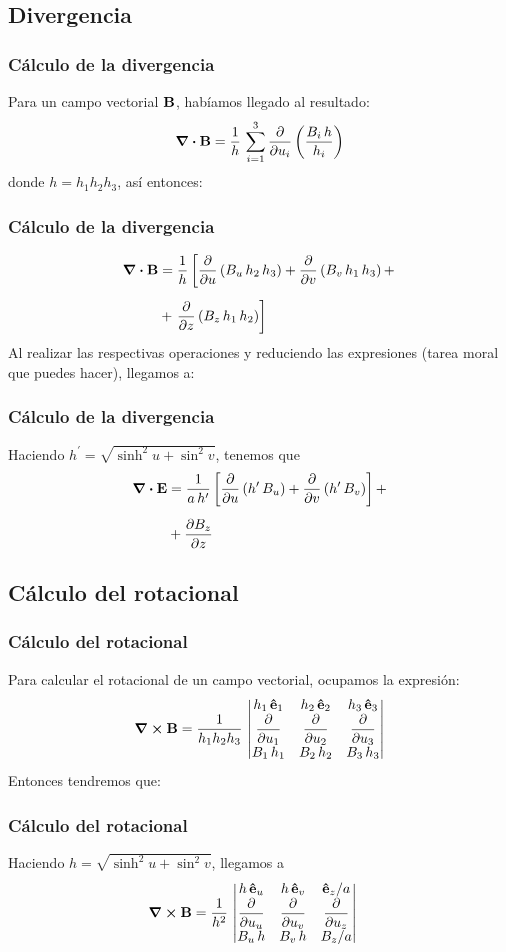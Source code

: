 \documentclass[12pt]{beamer}
\begin{document}
\subsection{Divergencia}
\begin{frame}
\frametitle{Cálculo de la divergencia}
Para un campo vectorial $\vb{B}$, habíamos llegado al resultado:
\begin{align*}
\div{\vb{B}} = \dfrac{1}{h} \, \sum_{i=1}^{3} \pdv{u_{i}} \left( \dfrac{B_{i} \, h}{h_{i}} \right)
\end{align*}
donde $h = h_{1} h_{2} h_{3}$, así entonces:
\end{frame}
\begin{frame}
\frametitle{Cálculo de la divergencia}
\begin{align*}
\div{\vb{B}} &= \dfrac{1}{h} \left[ \pdv{u} \left( B_{u} \, h_{2} \, h_{3} \right) + \pdv{v} \left( B_{v} \, h_{1} \, h_{3} \right) + \right. \\[0.5em]
&+ \left.\pdv{z} \left( B_{z} \, h_{1} \, h_{2} \right) \right]
\end{align*}
\pause
Al realizar las respectivas operaciones y reduciendo las expresiones (tarea moral que puedes hacer), llegamos a:
\end{frame}
\begin{frame}
\frametitle{Cálculo de la divergencia}
Haciendo $h^{\prime} = \sqrt{\sinh^{2} u + \sin^{2} v}$, tenemos que 
\begin{align*}
\div{\vb{E}} &= \dfrac{1}{a \, h^{\prime}} \left[ \pdv{u} \left( h^{\prime} \, B_{u} \right) + \pdv{v} \left( h^{\prime} \, B_{v} \right) \right] + \\[0.5em]
&+ \pdv{B_{z}}{z}
\end{align*}
\end{frame}
\subsection{Cálculo del rotacional}
\begin{frame}
\frametitle{Cálculo del rotacional}
Para calcular el rotacional de un campo vectorial, ocupamos la expresión:
\begin{align*}
\curl{\vb{B}} = \dfrac{1}{h_{1} h_{2} h_{3}} \, \mdet{
h_{1} \, \vu{e}_{1} & h_{2} \, \vu{e}_{2} & h_{3} \, \vu{e}_{3} \\
\displaystyle \pdv{u_{1}} & \displaystyle \pdv{u_{2}} & \displaystyle \pdv{u_{3}} \\
B_{1} \, h_{1} & B_{2} \, h_{2} & B_{3} \, h_{3}
}
\end{align*}
Entonces tendremos que:
\end{frame}
\begin{frame}
\frametitle{Cálculo del rotacional}
Haciendo $h = \sqrt{\sinh^{2} u + \sin^{2} v}$, llegamos a
\begin{align*}
\curl{\vb{B}} &= \dfrac{1}{h^{2}}  \, \mdet{
h \, \vu{e}_{u} & h \, \vu{e}_{v} & \vu{e}_{z} / a \\
\displaystyle \pdv{u_{u}} & \displaystyle \pdv{u_{v}} & \displaystyle \pdv{u_{z}} \\
B_{u} \, h & B_{v} \, h & B_{z} / a
}
\end{align*}
\end{frame}
\end{document}
